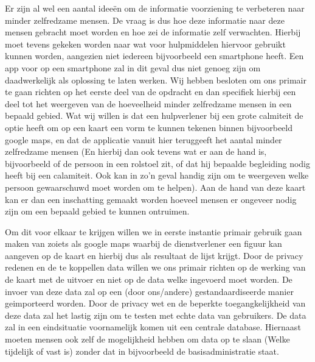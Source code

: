 Er zijn al wel een aantal idee\"{e}n om de informatie voorziening te verbeteren naar minder zelfredzame mensen. De vraag is dus hoe deze informatie naar deze mensen gebracht moet worden en hoe zei de informatie zelf verwachten. Hierbij moet tevens gekeken worden naar wat voor hulpmiddelen hiervoor gebruikt kunnen worden, aangezien niet iedereen bijvoorbeeld een smartphone heeft. Een app voor op een smartphone zal in dit geval dus niet genoeg zijn om daadwerkelijk als oplossing te laten werken.
Wij hebben besloten om ons primair te gaan richten op het eerste deel van de opdracht en dan specifiek hierbij een deel tot het weergeven van de hoeveelheid minder zelfredzame mensen in een bepaald gebied.
Wat wij willen is dat een hulpverlener bij een grote calmiteit de optie heeft om op een kaart een vorm te kunnen tekenen binnen bijvoorbeeld google maps, en dat de applicatie vanuit hier teruggeeft het aantal minder zelfredzame mensen (En hierbij dan ook tevens wat er aan de hand is, bijvoorbeeld of de persoon in een rolstoel zit, of dat hij bepaalde begleiding nodig heeft bij een calamiteit. Ook kan in zo'n geval handig zijn om te weergeven welke persoon gewaarschuwd moet worden om te helpen). Aan de hand van deze kaart kan er dan een inschatting gemaakt worden hoeveel mensen er ongeveer nodig zijn om een bepaald gebied te kunnen ontruimen. 

Om dit voor elkaar te krijgen willen we in eerste instantie primair gebruik gaan maken van zoiets als google maps waarbij de dienstverlener een figuur kan aangeven op de kaart en hierbij dus als resultaat de lijst krijgt. Door de privacy redenen en de te koppellen data willen we ons primair richten op de werking van de kaart met de uitvoer en niet op de data welke ingevoerd moet worden. De invoer van deze data zal op een (door ons/andere) gestandaardiseerde manier geimporteerd worden. Door de privacy wet en de beperkte toegangkelijkheid van deze data zal het lastig zijn om te testen met echte data van gebruikers. De data zal in een eindsituatie voornamelijk komen uit een centrale database. Hiernaast moeten mensen ook zelf de mogelijkheid hebben om data op te slaan (Welke tijdelijk of vast is) zonder dat in bijvoorbeeld de basisadministratie staat. 

